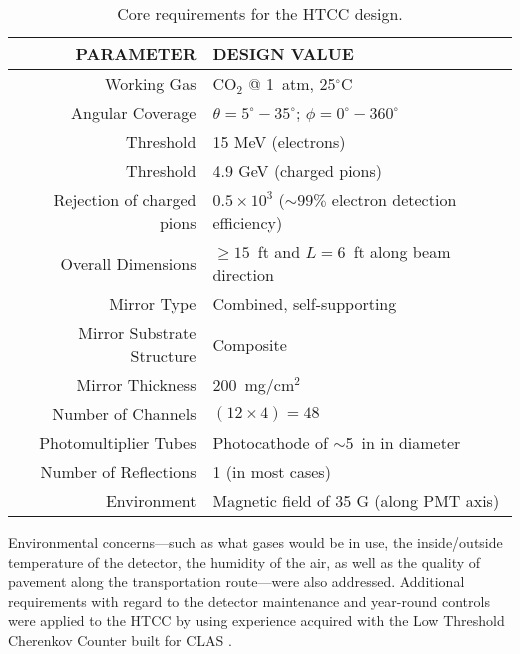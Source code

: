 \begin{table*}[t]
	\centering
	\caption{Core requirements for the HTCC design.}
	\begin{tabular}{ | r | l | }
		\hline
		PARAMETER & DESIGN VALUE \\ 
		\hline
		Working Gas & CO$_2$ @ 1~atm, 25$^\circ$C  \\ 
		\hline
		Angular Coverage & $\theta = 5^\circ - 35^\circ$; $\phi = 0^\circ - 360^\circ$ \\
		\hline
		Threshold & 15 MeV (electrons) \\
		\hline
		Threshold & 4.9 GeV (charged pions) \\
		\hline
		Rejection of charged pions & $0.5 \times 10^3$  ($\sim99\%$ electron detection efficiency)  \\
		\hline
		Overall Dimensions & $\geq 15$~ft and $L = 6$~ft along beam direction  \\
		\hline
		Mirror Type & Combined, self-supporting  \\
		\hline
		Mirror Substrate Structure & Composite  \\
		\hline
		Mirror Thickness & 200~mg/cm$^2$  \\
		\hline
		Number of Channels & $(12 \times 4) = 48$  \\
		\hline
		Photomultiplier Tubes & Photocathode of $\sim$5~in in diameter  \\
		\hline
		Number of Reflections & 1 (in most cases)   \\
		\hline
		Environment & Magnetic field of 35 G (along PMT axis)   \\
		\hline
	\end{tabular}
	\label{tab:1}
\end{table*}

Environmental concerns---such as what gases would be in use, the inside/outside temperature of the detector,
the humidity of the air, as well as the quality of pavement along the transportation route---were also addressed.
Additional requirements with regard to the detector maintenance and year-round controls were applied
to the HTCC by using experience acquired with the Low Threshold Cherenkov Counter built for CLAS
\cite{Adams:2001kk}.
